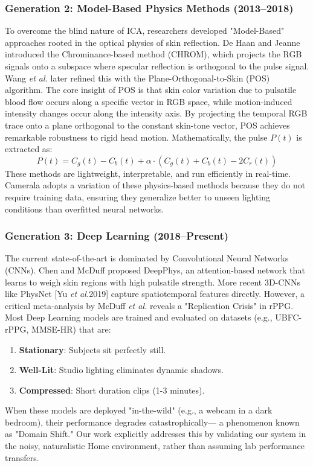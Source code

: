 \documentclass[journal]{IEEEtran}
\newcommand{\etal}{\textit{et al.}}
\begin{document}
\subsubsection{Generation 2: Model-Based Physics Methods (2013--2018)}
To overcome the blind nature of ICA, researchers developed "Model-Based" approaches rooted in the optical physics of skin reflection.
De Haan and Jeanne \cite{dehaan_chrom} introduced the Chrominance-based method (CHROM), which projects the RGB signals onto a subspace
where specular reflection is orthogonal to the pulse signal. Wang \etal \cite{wang_pos} later refined this with the Plane-Orthogonal-to-Skin (POS) algorithm.
The core insight of POS is that skin color variation due to pulsatile blood flow occurs along a specific vector in RGB space,
while motion-induced intensity changes occur along the intensity axis. By projecting the temporal RGB trace onto a plane orthogonal
to the constant skin-tone vector, POS achieves remarkable robustness to rigid head motion. Mathematically, the pulse $P(t)$ is extracted as:
\begin{equation}
    P(t) = C_g(t) - C_b(t) + \alpha \cdot (C_g(t) + C_b(t) - 2C_r(t))
\end{equation}
These methods are lightweight, interpretable, and run efficiently in real-time. Camerala adopts a variation of these physics-based methods
because they do not require training data, ensuring they generalize better to unseen lighting conditions than overfitted neural networks.

\subsubsection{Generation 3: Deep Learning (2018--Present)}
The current state-of-the-art is dominated by Convolutional Neural Networks (CNNs). Chen and McDuff \cite{deepphys} proposed DeepPhys,
an attention-based network that learns to weigh skin regions with high pulsatile strength. More recent 3D-CNNs like PhysNet [Yu \etal 2019]
capture spatiotemporal features directly.
However, a critical meta-analysis by McDuff \etal \cite{mcduff_rppg} reveals a "Replication Crisis" in rPPG.
Most Deep Learning models are trained and evaluated on datasets (e.g., UBFC-rPPG, MMSE-HR) that are:
\begin{enumerate}
    \item \textbf{Stationary}: Subjects sit perfectly still.
    \item \textbf{Well-Lit}: Studio lighting eliminates dynamic shadows.
    \item \textbf{Compressed}: Short duration clips (1-3 minutes).
\end{enumerate}
When these models are deployed "in-the-wild" (e.g., a webcam in a dark bedroom), their performance degrades catastrophically—
a phenomenon known as "Domain Shift." Our work explicitly addresses this by validating our system in the noisy, naturalistic Home environment,
rather than assuming lab performance transfers.
\end{document}
